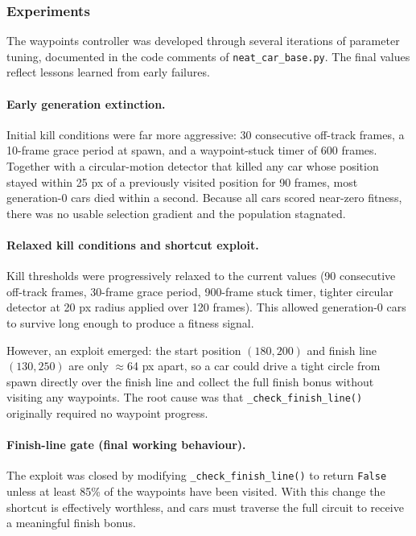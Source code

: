 \documentclass[a4paper]{article}
\begin{document}
\subsubsection{Experiments}
\label{subsubsec:waypoints-experiments}

The waypoints controller was developed through several iterations of parameter tuning,
documented in the code comments of \texttt{neat\_car\_base.py}.
The final values reflect lessons learned from early failures.

\paragraph{Early generation extinction.}
Initial kill conditions were far more aggressive: 30 consecutive off-track frames,
a 10-frame grace period at spawn, and a waypoint-stuck timer of 600 frames.
Together with a circular-motion detector that killed any car whose position stayed
within 25 px of a previously visited position for 90 frames, most generation-0
cars died within a second.
Because all cars scored near-zero fitness, there was no usable selection gradient and
the population stagnated.

\paragraph{Relaxed kill conditions and shortcut exploit.}
Kill thresholds were progressively relaxed to the current values
(90 consecutive off-track frames, 30-frame grace period, 900-frame stuck timer,
tighter circular detector at 20 px radius applied over 120 frames).
This allowed generation-0 cars to survive long enough to produce a fitness signal.

However, an exploit emerged: the start position $(180, 200)$ and finish line
$(130, 250)$ are only $\approx$64 px apart, so a car could drive a tight circle
from spawn directly over the finish line and collect the full finish bonus without
visiting any waypoints.
The root cause was that \texttt{\_check\_finish\_line()} originally required no
waypoint progress.

\paragraph{Finish-line gate (final working behaviour).}
The exploit was closed by modifying \texttt{\_check\_finish\_line()} to return
\texttt{False} unless at least 85\% of the waypoints have been visited.
With this change the shortcut is effectively worthless, and cars must traverse the
full circuit to receive a meaningful finish bonus.
\end{document}
